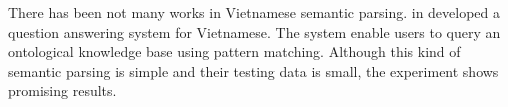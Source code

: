 There has been not many works in Vietnamese semantic parsing. \citeauthor{Nguyen:2009:VQA:1681518.1683170} in \cite{Nguyen:2009:VQA:1681518.1683170} developed a question answering system for Vietnamese. The system enable users to query an ontological knowledge base using pattern matching. Although this kind of semantic parsing is simple and their testing data is small, the experiment shows promising results. 